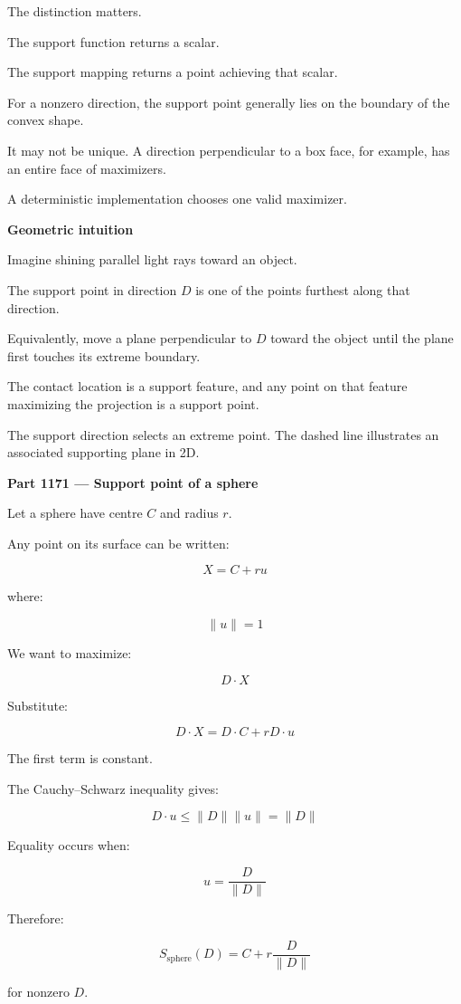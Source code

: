 The distinction matters.

The support function returns a scalar.

The support mapping returns a point achieving that scalar.

For a nonzero direction, the support point generally lies on the boundary of the convex shape.

It may not be unique. A direction perpendicular to a box face, for example, has an entire face of maximizers.

A deterministic implementation chooses one valid maximizer.

\textbf{Geometric intuition}

Imagine shining parallel light rays toward an object.

The support point in direction \(D\) is one of the points furthest along that direction.

Equivalently, move a plane perpendicular to \(D\) toward the object until the plane first touches its extreme boundary.

The contact location is a support feature, and any point on that feature maximizing the projection is a support point.

The support direction selects an extreme point. The dashed line illustrates an associated supporting plane in 2D.

\textbf{Part 1171 --- Support point of a sphere}

Let a sphere have centre \(C\) and radius \(r\).

Any point on its surface can be written:

\[
X=C+ru
\]

where:

\[
\|u\|=1
\]

We want to maximize:

\[
D\cdot X
\]

Substitute:

\[
D\cdot X=D\cdot C+rD\cdot u
\]

The first term is constant.

The Cauchy--Schwarz inequality gives:

\[
D\cdot u\le\|D\|\|u\|=\|D\|
\]

Equality occurs when:

\[
u=\frac{D}{\|D\|}
\]

Therefore:

\[
\boxed{ S_{\mathrm{sphere}}(D)= C+r\frac{D}{\|D\|} }
\]

for nonzero \(D\).

